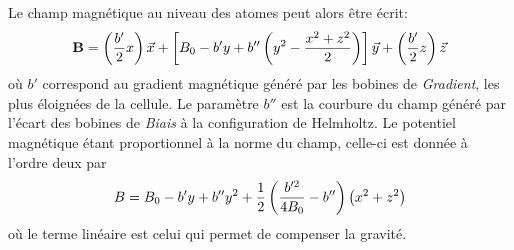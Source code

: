 Le champ magnétique au niveau des atomes peut alors être écrit:
\begin{equation}
\mathbf{B}=\left( \frac{b'}{2}x \right) \vec{x} + \left[ B_0 - b'y + b'' \left( y^2 - \frac{x^2+z^2}{2} \right) \right] \vec{y} + \left( \frac{b'}{2}z \right) \vec{z}
\end{equation}
où $b'$ correspond au gradient magnétique généré par les bobines de \emph{Gradient}, les plus éloignées de la cellule. Le  paramètre $b''$ est la courbure du champ généré par l'écart des bobines de \emph{Biais} à la configuration de Helmholtz. 
Le potentiel magnétique étant proportionnel à la norme du champ, celle-ci est donnée à l'ordre deux par
\begin{equation}
B=B_0 -b' y + b'' y^2 +\frac{1}{2} \left( \frac{b'^2}{4 B_0} - b'' \right) \left( x^2 + z^2 \right) 
\label{eq:norme_levitation}
\end{equation}
où le terme linéaire est celui qui permet de compenser la gravité.



